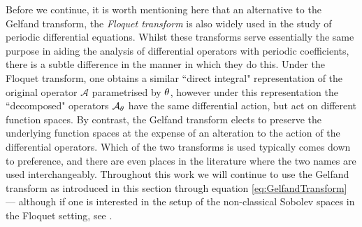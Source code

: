 Before we continue, it is worth mentioning here that an alternative to the Gelfand transform, the \emph{Floquet transform} is also widely used in the study of periodic differential equations.
Whilst these transforms serve essentially the same purpose in aiding the analysis of differential operators with periodic coefficients, there is a subtle difference in the manner in which they do this.
Under the Floquet transform, one obtains a similar ``direct integral" representation of the original operator $\mathcal{A}$ parametrised by $\theta$, however under this representation the ``decomposed" operators $\mathcal{A}_{\theta}$ have the same differential action, but act on different function spaces.
By contrast, the Gelfand transform elects to preserve the underlying function spaces at the expense of an alteration to the action of the differential operators.
Which of the two transforms is used typically comes down to preference, and there are even places in the literature where the two names are used interchangeably.
Throughout this work we will continue to use the Gelfand transform as introduced in this section through equation \eqref{eq:GelfandTransform} --- although if one is interested in the setup of the non-classical Sobolev spaces in the Floquet setting, see \cite{cherednichenko2018operator, cherednichenko2022operator}.